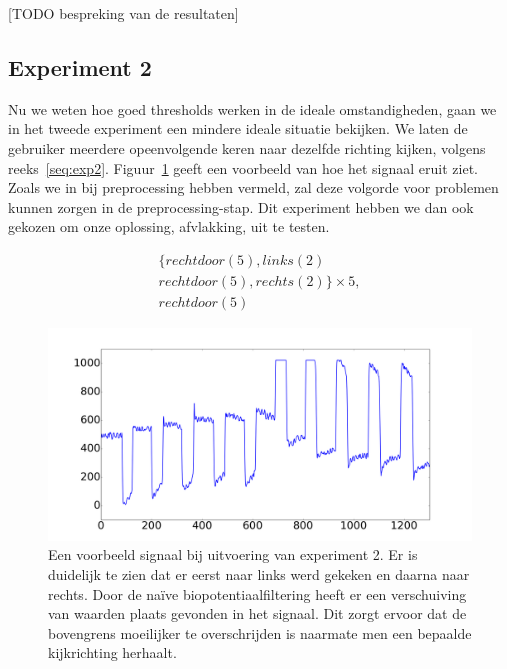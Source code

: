 \documentclass{article}
\begin{document}
[TODO bespreking van de resultaten]

\subsection{Experiment 2}

Nu we weten hoe goed thresholds werken in de ideale omstandigheden, gaan we in het tweede experiment een mindere ideale situatie bekijken. We laten de gebruiker meerdere opeenvolgende keren naar dezelfde richting kijken, volgens reeks~\ref{seq:exp2}. Figuur~\ref{fig:exp2} geeft een voorbeeld van hoe het signaal eruit ziet. Zoals we in bij preprocessing hebben vermeld, zal deze volgorde voor problemen kunnen zorgen in de preprocessing-stap. Dit experiment hebben we dan ook gekozen om onze oplossing, afvlakking, uit te testen.

\begin{equation}
\begin{aligned}
\label{seq:exp2}
& \{rechtdoor(5), links(2) & \\
& rechtdoor(5), rechts(2)\} \times 5,& \\
& rechtdoor(5) &
\end{aligned}
\end{equation}


\begin{figure}[h]
\centering
\includegraphics[width=\linewidth]{images/experiment2}
\caption{Een voorbeeld signaal bij uitvoering van experiment 2. Er is duidelijk te zien dat er eerst naar links werd gekeken en daarna naar rechts. Door de naïve biopotentiaalfiltering heeft er een verschuiving van waarden plaats gevonden in het signaal. Dit zorgt ervoor dat de bovengrens moeilijker te overschrijden is naarmate men een bepaalde kijkrichting herhaalt.}
\label{fig:exp2}
\end{figure}
\end{document}
